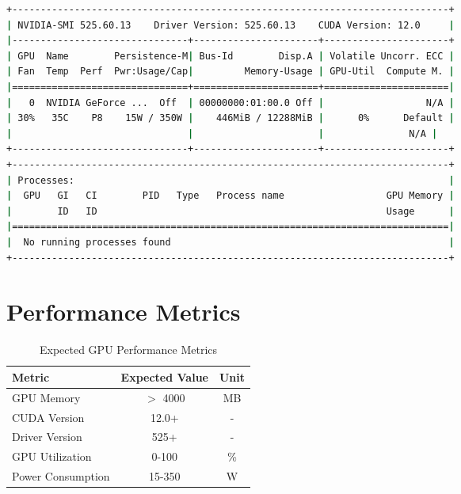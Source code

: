 \documentclass[12pt,a4paper]{report}
\begin{document}
\begin{lstlisting}[language=bash,caption=Expected nvidia-smi Output,label=lst:nvidia-output]
+-----------------------------------------------------------------------------+
| NVIDIA-SMI 525.60.13    Driver Version: 525.60.13    CUDA Version: 12.0     |
|-------------------------------+----------------------+----------------------+
| GPU  Name        Persistence-M| Bus-Id        Disp.A | Volatile Uncorr. ECC |
| Fan  Temp  Perf  Pwr:Usage/Cap|         Memory-Usage | GPU-Util  Compute M. |
|===============================+======================+======================|
|   0  NVIDIA GeForce ...  Off  | 00000000:01:00.0 Off |                  N/A |
| 30%   35C    P8    15W / 350W |    446MiB / 12288MiB |      0%      Default |
|                               |                      |               N/A |
+-------------------------------+----------------------+----------------------+
+-----------------------------------------------------------------------------+
| Processes:                                                                  |
|  GPU   GI   CI        PID   Type   Process name                  GPU Memory |
|        ID   ID                                                   Usage      |
|=============================================================================|
|  No running processes found                                                 |
+-----------------------------------------------------------------------------+
\end{lstlisting}

\section{Performance Metrics}
\begin{table}[h]
    \centering
    \caption{Expected GPU Performance Metrics}
    \label{tab:performance-metrics}
    \begin{tabular}{@{}lcc@{}}
        \toprule
        \textbf{Metric} & \textbf{Expected Value} & \textbf{Unit} \\
        \midrule
        GPU Memory & $>$ 4000 & MB \\
        CUDA Version & 12.0+ & - \\
        Driver Version & 525+ & - \\
        GPU Utilization & 0-100 & \% \\
        Power Consumption & 15-350 & W \\
        \bottomrule
    \end{tabular}
\end{table}
\end{document}
